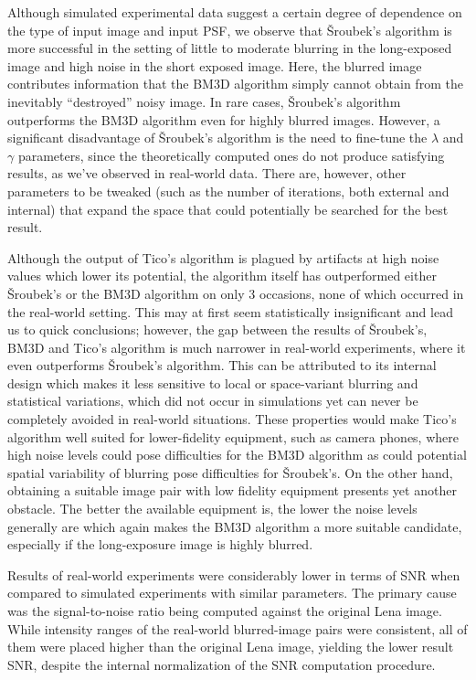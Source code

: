 \documentclass[12pt,notitlepage]{report}
\begin{document}
\clearpage

Although simulated experimental data suggest a certain degree of dependence on the type of input image and input PSF, we observe that Šroubek's algorithm is more successful in the setting of little to moderate blurring in the long-exposed image and high noise in the short exposed image. Here, the blurred image contributes information that the BM3D algorithm simply cannot obtain from the inevitably “destroyed” noisy image. In rare cases, Šroubek's algorithm outperforms the BM3D algorithm even for highly blurred images. However, a significant disadvantage of Šroubek's algorithm is the need to fine-tune the $\lambda$ and $\gamma$ parameters, since the theoretically computed ones do not produce satisfying results, as we've observed in real-world data. There are, however, other parameters to be tweaked (such as the number of iterations, both external and internal) that expand the space that could potentially be searched for the best result. 

Although the output of Tico's algorithm is plagued by artifacts at high noise values which lower its potential, the algorithm itself has outperformed either Šroubek's or the BM3D algorithm on only 3 occasions, none of which occurred in the real-world setting. This may at first seem statistically insignificant and lead us to quick conclusions; however, the gap between the results of Šroubek's, BM3D and Tico's algorithm is much narrower in real-world experiments, where it even outperforms Šroubek's algorithm. This can be attributed to its internal design which makes it less sensitive to local or space-variant blurring and statistical variations, which did not occur in simulations yet can never be completely avoided in real-world situations. These properties would make Tico's algorithm well suited for lower-fidelity equipment, such as camera phones, where high noise levels could pose difficulties for the BM3D algorithm as could potential spatial variability of blurring pose difficulties for Šroubek's. On the other hand, obtaining a suitable image pair with low fidelity equipment presents yet another obstacle. The better the available equipment is, the lower the noise levels generally are which again makes the BM3D algorithm a more suitable candidate, especially if the long-exposure image is highly blurred.

Results of real-world experiments were considerably lower in terms of SNR when compared to simulated experiments with similar parameters. The primary cause was the signal-to-noise ratio being computed against the original Lena image. While intensity ranges of the real-world blurred-image pairs were consistent, all of them were placed higher than the original Lena image, yielding the lower result SNR, despite the internal normalization of the SNR computation procedure. 
\end{document}
